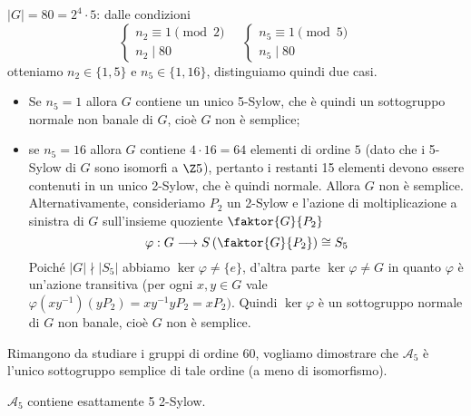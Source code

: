 \documentclass[11pt]{scrartcl}
\begin{document}
\underline{$|G| = 80 = 2^4\cdot 5$}: dalle condizioni
\[
    \begin{cases}
        n_2 \equiv 1 \pmod 2\\
        n_2 \mid 80
    \end{cases}\quad
    \begin{cases}
        n_5 \equiv 1 \pmod 5\\
        n_5 \mid 80
    \end{cases}
\]
otteniamo $n_2 \in \{1, 5\}$ e $n_5 \in \{1, 16\}$, distinguiamo quindi due
casi.
\begin{itemize}
    \item Se $n_5 = 1$ allora $G$ contiene un unico 5-Sylow, che è quindi un
    sottogruppo normale non banale di $G$, cioè $G$ non è semplice;
    \item se $n_5 = 16$ allora $G$ contiene $4\cdot 16 = 64$ elementi di ordine
    $5$ (dato che i 5-Sylow di $G$ sono isomorfi a $\Z5$), pertanto i restanti
    15 elementi devono essere contenuti in un unico 2-Sylow, che è quindi normale.
    Allora $G$ non è semplice. \newline Alternativamente, consideriamo $P_2$ un 2-Sylow
    e l'azione di moltiplicazione a sinistra di $G$ sull'insieme quoziente $\faktor{G}{P_2}$
    \[
        \varphi: G\longrightarrow S\left(\faktor{G}{P_2}\right) \cong S_5
    \]
    Poiché $|G| \nmid |S_5|$ abbiamo $\ker\varphi\neq\{e\}$, d'altra parte
    $\ker\varphi \neq G$ in quanto $\varphi$ è un'azione transitiva (per 
    ogni $x, y \in G$ vale $\varphi(xy^{-1})(yP_2) = xy^{-1}yP_2 = xP_2)$.
    Quindi $\ker\varphi$ è un sottogruppo normale di $G$ non banale, cioè $G$
    non è semplice. 
\end{itemize}

Rimangono da studiare i gruppi di ordine $60$, vogliamo dimostrare che 
$\mathcal{A}_5$ è l'unico sottogruppo semplice di tale ordine (a meno di isomorfismo).

\begin{lemma}
    $\mathcal{A}_5$ contiene esattamente 5 2-Sylow.
\end{lemma}
\end{document}
